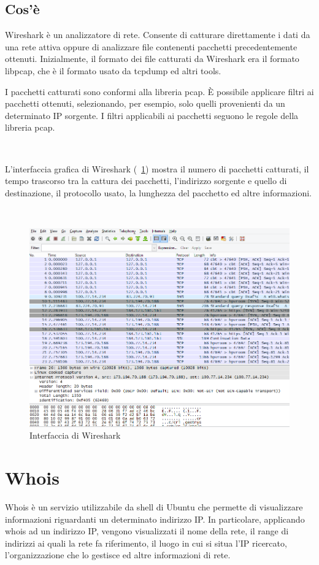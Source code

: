 \documentclass[a4paper,11pt]{book}
\begin{document}
\subsection{Cos'\`e}
Wireshark \cite{rif6} \`e un analizzatore di rete. Consente di catturare direttamente i dati da una rete attiva oppure di analizzare file contenenti pacchetti precedentemente ottenuti. Inizialmente, il formato dei file catturati da Wireshark era il formato libpcap, che \`e il formato usato da tcpdump ed altri tools.

I pacchetti catturati sono conformi alla libreria pcap. \`E possibile applicare filtri ai pacchetti ottenuti, selezionando, per esempio, solo quelli provenienti da un determinato IP sorgente. I filtri applicabili ai pacchetti seguono le regole della libreria pcap.

~

L'interfaccia grafica di Wireshark (\figurename ~\ref{fig:Whireshark}) mostra il numero di pacchetti catturati, il tempo trascorso tra la cattura dei pacchetti, l'indirizzo sorgente e quello di destinazione, il protocollo usato, la lunghezza del pacchetto ed altre informazioni.

~

\begin{figure}[!ht]
\centering
\includegraphics[scale = 0.5]{Whireshark}
\caption{Interfaccia di Wireshark}
\label{fig:Whireshark}
\end{figure}

\clearpage

\section{Whois}
Whois \cite{rif7} \`e un servizio utilizzabile da shell di Ubuntu che permette di visualizzare informazioni riguardanti un determinato indirizzo IP.
In particolare, applicando whois ad un indirizzo IP, vengono visualizzati il nome della rete, il range di indirizzi ai quali la rete fa riferimento, il luogo in cui si situa l'IP ricercato, l'organizzazione che lo gestisce ed altre informazioni di rete.
\end{document}

